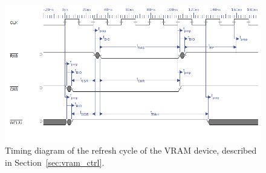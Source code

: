 \documentclass[titlepage]{scrartcl}
\begin{document}
	\clearpage

	

	\clearpage

	\begin{figure}[h!]
	\vspace{-2cm}
	\centerline{\includegraphics[width=25cm, angle=90, origin=c]{img/vram_refresh.png}}
		\vspace{1cm}
                	\caption{Timing diagram of the refresh cycle of the VRAM device, described in Section~\ref{sec:vram_ctrl}.}
               	\label{fig:vram_refresh}
	\end{figure}

	\clearpage
\end{document}
